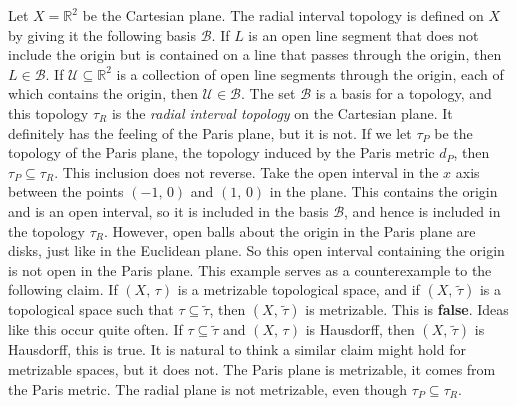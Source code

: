 \documentclass{article}
\theoremstyle{plain}
\theoremstyle{normal}
\newenvironment{example}{%
    \pushQED{\qed}\renewcommand{\qedsymbol}{$\blacksquare$}\examplex%
}{%
    \popQED\endexamplex%
}
\begin{document}
        \begin{example}[\textbf{The Radial Interval Topology}]
            Let $X=\mathbb{R}^{2}$ be the Cartesian plane. The radial interval
            topology is defined on $X$ by giving it the following basis
            $\mathcal{B}$. If $L$ is an open line segment that does not include
            the origin but is contained on a line that passes through the
            origin, then $L\in\mathcal{B}$. If
            $\mathcal{U}\subseteq\mathbb{R}^{2}$ is a collection of open
            line segments through the origin, each of which contains the
            origin, then $\mathcal{U}\in\mathcal{B}$. The set
            $\mathcal{B}$ is a basis for a topology, and this topology
            $\tau_{R}$ is the \textit{radial interval topology} on the
            Cartesian plane. It definitely has the feeling of the Paris plane,
            but it is not. If we let $\tau_{P}$ be the topology of the Paris
            plane, the topology induced by the Paris metric $d_{P}$, then
            $\tau_{P}\subseteq\tau_{R}$. This inclusion does not reverse.
            Take the open interval in the $x$ axis between the points
            $(-1,\,0)$ and $(1,\,0)$ in the plane. This contains the origin and
            is an open interval, so it is included in the basis $\mathcal{B}$,
            and hence is included in the topology $\tau_{R}$. However, open
            balls about the origin
            in the Paris plane are disks, just like in the Euclidean plane.
            So this open interval containing the origin is not open in the
            Paris plane. This example serves as a counterexample to the
            following claim. If $(X,\,\tau)$ is a metrizable topological space,
            and if $(X,\,\tilde{\tau})$ is a topological space such that
            $\tau\subseteq\tilde{\tau}$, then $(X,\,\tilde{\tau})$ is
            metrizable. This is \textbf{false}. Ideas like this occur quite
            often. If $\tau\subseteq\tilde{\tau}$ and $(X,\,\tau)$ is Hausdorff,
            then $(X,\,\tilde{\tau})$ is Hausdorff, this is true. It is
            natural to think a similar claim might hold for metrizable spaces,
            but it does not. The Paris plane is metrizable, it comes from the
            Paris metric. The radial plane is not metrizable, even though
            $\tau_{P}\subseteq\tau_{R}$.
        \end{example}
\end{document}
